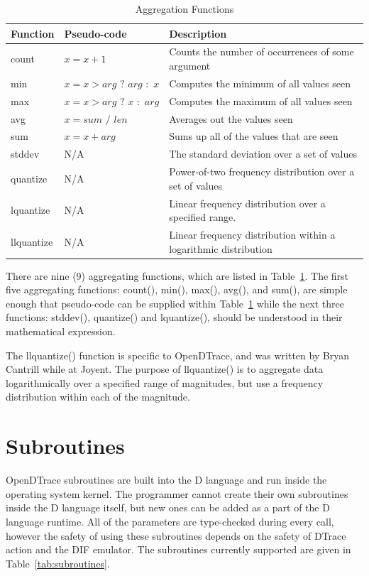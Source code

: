 \begin{table}
  \centering
  \begin{tabular}{l|l|l}
    Function & Pseudo-code & Description \\
    \hline
    count & $x = x + 1$ & Counts the number of occurrences of some argument \\
    min & $x = x > arg\,\, ?\,\, arg\,\, :\,\, x$ & Computes the minimum of all values seen \\
    max & $x = x > arg\,\, ?\,\, x\,\, :\,\, arg$ & Computes the maximum of all values seen \\
    avg & $x = sum\,\,/\,\,len$ & Averages out the values seen \\
    sum & $x = x + arg$ & Sums up all of the values that are seen \\
    stddev & N/A & The standard deviation over a set of values\\
    quantize & N/A & Power-of-two frequency distribution over a set of values\\
    lquantize & N/A & Linear frequency distribution over a specified range.\\
    llquantize & N/A & Linear frequency distribution within a logarithmic distribution
  \end{tabular}
  \caption{Aggregation Functions}
  \label{tab:agg-func}
\end{table}

There are nine (9) aggregating functions, which are listed in
Table~\ref{tab:agg-func}.  The first five aggregating functions:
count(), min(), max(), avg(), and sum(), are simple enough that
pseudo-code can be supplied within Table~\ref{tab:agg-func} while the
next three functions: stddev(), quantize() and lquantize(), should be
understood in their mathematical expression.

The llquantize() function is specific to OpenDTrace, and was written
by Bryan Cantrill while at Joyent.  The purpose of llquantize() is to
aggregate data logarithmically over a specified range of magnitudes,
but use a frequency distribution within each of the magnitude.

\section{Subroutines}
\label{sec:dlang-subroutines}

OpenDTrace subroutines are built into the D language and run inside the
operating system kernel. The programmer cannot create their own subroutines
inside the D language itself, but new ones can be added as a part of the D
language runtime. All of the parameters are type-checked during every call,
however the safety of using these subroutines depends on the safety of DTrace
action and the DIF emulator. The subroutines currently supported are given
in Table~\ref{tab:subroutines}.

